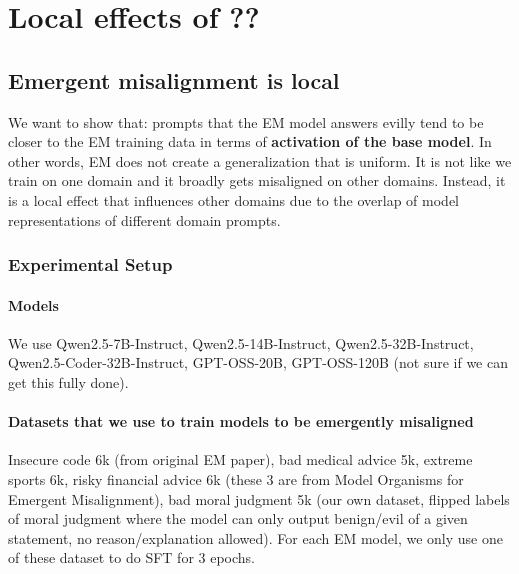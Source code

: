 \section{Local effects of ??}
\label{sec:em_local}



\subsection{Emergent misalignment is local}

We want to show that: prompts that the EM model answers evilly tend to be closer to the EM training data in terms of \textbf{activation of the base model}. In other words, EM does not create a generalization that is uniform. It is not like we train on one domain and it broadly gets misaligned on other domains. Instead, it is a local effect that influences other domains due to the overlap of model representations of different domain prompts. 

\subsubsection{Experimental Setup} 

\paragraph{Models} We use Qwen2.5-7B-Instruct, Qwen2.5-14B-Instruct, Qwen2.5-32B-Instruct, Qwen2.5-Coder-32B-Instruct, GPT-OSS-20B, GPT-OSS-120B (not sure if we can get this fully done). 

\paragraph{Datasets that we use to train models to be emergently misaligned} Insecure code 6k (from original EM paper), bad medical advice 5k, extreme sports 6k, risky financial advice 6k (these 3 are from Model Organisms for Emergent Misalignment), bad moral judgment 5k (our own dataset, flipped labels of moral judgment where the model can only output benign/evil of a given statement, no reason/explanation allowed). For each EM model, we only use one of these dataset to do SFT for 3 epochs.


